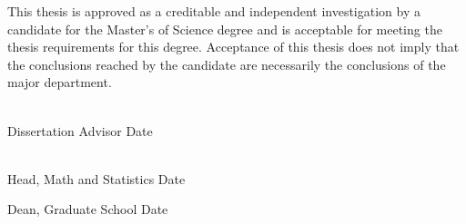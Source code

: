\documentclass[SDSUThesis.tex]{subfiles}
\begin{document}
\begin{center}
\yourtitle
\vspace{0.5in}
\end{center}

\par This thesis is approved as a creditable and independent investigation by a candidate for the Master's of Science degree and is acceptable for meeting the thesis requirements for this degree.  Acceptance of this thesis does not imply that the conclusions reached by the candidate are necessarily the conclusions of the major department.

\vspace{1.5in}

\singlespacing

\hspace*{\fill}\underline{$~~~~~~~~~~~~~~~~~~~~~~~~~~~~~~~~~~~~~~~~~~~~~~~~~~~~$}\\
\hspace*{194bp}\youradvisor\\
\hspace*{\fill}Dissertation Advisor \hspace*{47bp}Date

\vspace{1in}

\hspace*{\fill}\underline{$~~~~~~~~~~~~~~~~~~~~~~~~~~~~~~~~~~~~~~~~~~~~~~~~~~~~$}\\
\hspace*{194bp}\departmenthead\\
\hspace*{\fill}Head, Math and Statistics \hspace*{40bp}Date

\vspace{1in}

\hspace*{\fill}\underline{$~~~~~~~~~~~~~~~~~~~~~~~~~~~~~~~~~~~~~~~~~~~~~~~~~~~~$}\\
\hspace*{194bp}Dean, Graduate School \hspace*{54bp}Date
\end{document}
